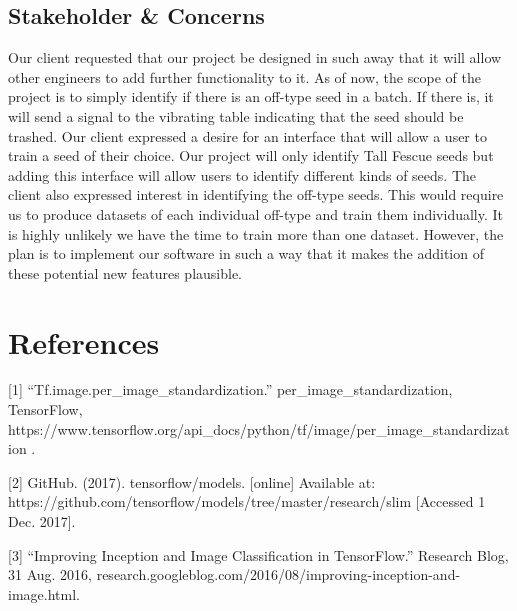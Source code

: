 \documentclass[onecolumn, draftclsnofoot,10pt, compsoc]{IEEEtran}
\begin{document}
\subsection{Stakeholder \& Concerns}
Our client requested that our project be designed in such away that it will allow other engineers to add further functionality to it. As of now, the scope of the project is to simply identify if there is an off-type seed in a batch. If there is, it will send a signal to the vibrating table indicating that the seed should be trashed. Our client expressed a desire for an interface that will allow a user to train a seed of their choice. Our project will only identify Tall Fescue seeds but adding this interface will allow users to identify different kinds of seeds. The client also expressed interest in identifying the off-type seeds. This would require us to produce datasets of each individual off-type and train them individually. It is highly unlikely we have the time to train more than one dataset. However, the plan is to implement our software in such a way that it makes the addition of these potential new features plausible. 

\section{References}

[1] “Tf.image.per\_image\_standardization.” per\_image\_standardization, TensorFlow, https://www.tensorflow.org/api\_docs/python/tf/image/per\_image\_standardization . 

[2] GitHub. (2017). tensorflow/models. [online] Available at: https://github.com/tensorflow/models/tree/master/research/slim [Accessed 1 Dec. 2017].

[3] “Improving Inception and Image Classification in TensorFlow.” Research Blog, 31 Aug. 2016, research.googleblog.com/2016/08/improving-inception-and-image.html.
\end{document}
